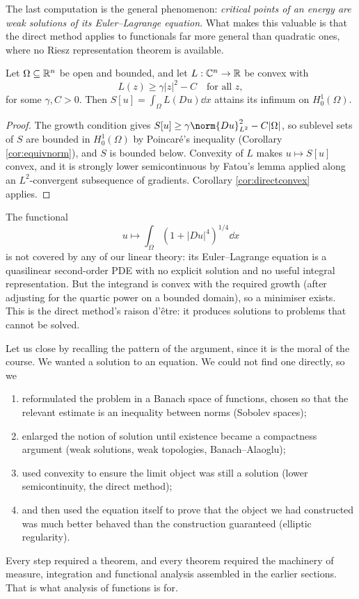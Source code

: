 \documentclass[a4paper]{scrartcl}
\begin{document}
The last computation is the general phenomenon: \emph{critical points of an energy are weak solutions of its Euler--Lagrange equation}. What makes this valuable is that the direct method applies to functionals far more general than quadratic ones, where no Riesz representation theorem is available.

\begin{theorem}\label{thm:convexintegrand}
	Let $\Omega\subseteq\mathbb{R}^n$ be open and bounded, and let $L : \mathbb{C}^n\to\mathbb{R}$ be convex with
	$$L(z)\ge\gamma|z|^2-C \quad \text{for all }z,$$
	for some $\gamma, C>0$. Then $S[u]=\int_\Omega L(Du)\dd x$ attains its infimum on $H_0^1(\Omega)$.
\end{theorem}

\begin{proof}
	The growth condition gives $S[u]\ge\gamma\norm{Du}^2_{L^2}-C|\Omega|$, so sublevel sets of $S$ are bounded in $H_0^1(\Omega)$ by Poincar\'e's inequality (Corollary \ref{cor:equivnorm}), and $S$ is bounded below. Convexity of $L$ makes $u \mapsto S[u]$ convex, and it is strongly lower semicontinuous by Fatou's lemma applied along an $L^2$-convergent subsequence of gradients. Corollary \ref{cor:directconvex} applies.
\end{proof}

\begin{example}
	The functional
	$$u \mapsto \int_\Omega\left(1+|Du|^4\right)^{1/4}\dd x$$
	is not covered by any of our linear theory: its Euler--Lagrange equation is a quasilinear second-order PDE with no explicit solution and no useful integral representation. But the integrand is convex with the required growth (after adjusting for the quartic power on a bounded domain), so a minimiser exists. This is the direct method's raison d'\^etre: it produces solutions to problems that cannot be solved.
\end{example}

\begin{remark}
	Let us close by recalling the pattern of the argument, since it is the moral of the course. We wanted a solution to an equation. We could not find one directly, so we
	\begin{enumerate}[label=(\roman*)]
		\item reformulated the problem in a Banach space of functions, chosen so that the relevant estimate is an inequality between norms (Sobolev spaces);
		\item enlarged the notion of solution until existence became a compactness argument (weak solutions, weak topologies, Banach--Alaoglu);
		\item used convexity to ensure the limit object was still a solution (lower semicontinuity, the direct method);
		\item and then used the equation itself to prove that the object we had constructed was much better behaved than the construction guaranteed (elliptic regularity).
	\end{enumerate}
	Every step required a theorem, and every theorem required the machinery of measure, integration and functional analysis assembled in the earlier sections. That is what analysis of functions is for.
\end{remark}
\end{document}
